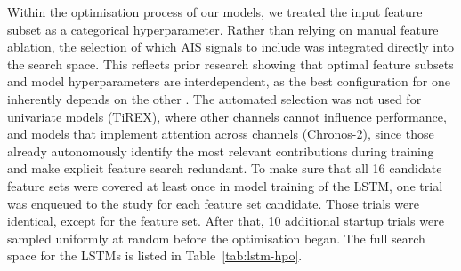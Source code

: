            Within the optimisation process of our models, we treated the input feature subset as a categorical hyperparameter. Rather than relying on manual feature ablation, the selection of which \ac{AIS} signals to include was integrated directly into the search space. This reflects prior research showing that optimal feature subsets and model hyperparameters are interdependent, as the best configuration for one inherently depends on the other \parencite{Feurer2015}.
           The automated selection was not used for univariate models (TiREX), where other channels cannot influence performance, and models that implement attention across channels (Chronos-2), since those already autonomously identify the most relevant contributions during training and make explicit feature search redundant.                 
        To make sure that all 16 candidate feature sets were covered at least once in model training of the \acs{LSTM}, one trial was enqueued to the study for each feature set candidate. Those trials were identical, except for the feature set. After that, 10 additional startup trials were sampled uniformly at random %
        before the optimisation began. The full search space for the \acp{LSTM} is listed
        in Table~\ref{tab:lstm-hpo}. 


